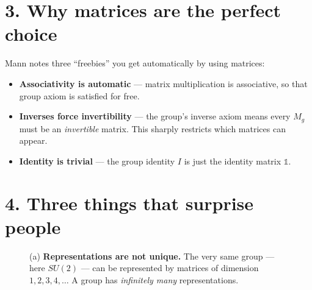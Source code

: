 \documentclass[11pt]{article}
\begin{document}
\section*{3. Why matrices are the perfect choice}

Mann notes three ``freebies'' you get automatically by using matrices:

\begin{itemize}[leftmargin=1.4em, itemsep=2pt]
  \item \textbf{Associativity is automatic} --- matrix multiplication is
        associative, so that group axiom is satisfied for free.
  \item \textbf{Inverses force invertibility} --- the group's inverse axiom
        means every $M_g$ must be an \emph{invertible} matrix. This sharply
        restricts which matrices can appear.
  \item \textbf{Identity is trivial} --- the group identity $I$ is just the
        identity matrix $\mathbb{1}$.
\end{itemize}

\section*{4. Three things that surprise people}

\begin{figure}[H]
\centering
{}
\caption{(a) \textbf{Representations are not unique.} The very same group ---
here $SU(2)$ --- can be represented by matrices of dimension
$1,2,3,4,\dots$ A group has \emph{infinitely many} representations.}
\end{figure}
\end{document}
